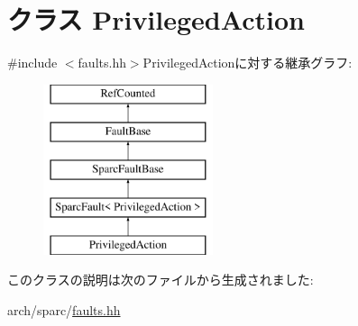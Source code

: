 \hypertarget{classSparcISA_1_1PrivilegedAction}{
\section{クラス PrivilegedAction}
\label{classSparcISA_1_1PrivilegedAction}
}


{\ttfamily \#include $<$faults.hh$>$}PrivilegedActionに対する継承グラフ:\begin{figure}[H]
\begin{center}
\leavevmode
\includegraphics[height=5cm]{classSparcISA_1_1PrivilegedAction}
\end{center}
\end{figure}


このクラスの説明は次のファイルから生成されました:\begin{DoxyCompactItemize}
\item 
arch/sparc/\hyperlink{arch_2sparc_2faults_8hh}{faults.hh}\end{DoxyCompactItemize}
